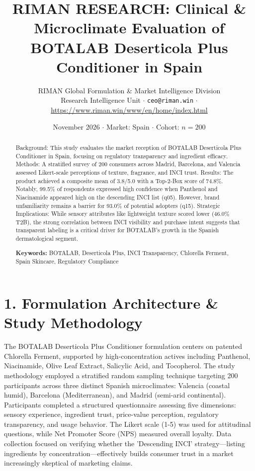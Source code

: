 \documentclass[10pt,twocolumn,a4paper]{article}
\title{\textbf{RIMAN RESEARCH: Clinical \& Microclimate Evaluation of BOTALAB Deserticola Plus Conditioner in Spain}}
\author{RIMAN Global Formulation \& Market Intelligence Division\\
\small Research Intelligence Unit $\cdot$ \texttt{ceo@riman.win} $\cdot$ \url{https://www.riman.win/www/en/home/index.html}}
\date{November 2026 \quad $\cdot$ \quad Market: Spain \quad $\cdot$ \quad Cohort: $n = 200$}
\begin{document}
\maketitle

\begin{abstract}
Background: This study evaluates the market reception of BOTALAB Deserticola Plus Conditioner in Spain, focusing on regulatory transparency and ingredient efficacy. Methods: A stratified survey of 200 consumers across Madrid, Barcelona, and Valencia assessed Likert-scale perceptions of texture, fragrance, and INCI trust. Results: The product achieved a composite mean of 3.8/5.0 with a Top-2-Box score of 74.8\%. Notably, 99.5\% of respondents expressed high confidence when Panthenol and Niacinamide appeared high on the descending INCI list (q05). However, brand unfamiliarity remains a barrier for 93.0\% of potential adopters (q15). Strategic Implications: While sensory attributes like lightweight texture scored lower (46.0\% T2B), the strong correlation between INCI visibility and purchase intent suggests that transparent labeling is a critical driver for BOTALAB's growth in the Spanish dermatological segment.

\vspace{0.4em}
\noindent\textbf{Keywords:} BOTALAB, Deserticola Plus, INCI Transparency, Chlorella Ferment, Spain Skincare, Regulatory Compliance
\end{abstract}

\section{1. Formulation Architecture \& Study Methodology}
The BOTALAB Deserticola Plus Conditioner formulation centers on patented Chlorella Ferment, supported by high-concentration actives including Panthenol, Niacinamide, Olive Leaf Extract, Salicylic Acid, and Tocopherol. The study methodology employed a stratified random sampling technique targeting 200 participants across three distinct Spanish microclimates: Valencia (coastal humid), Barcelona (Mediterranean), and Madrid (semi-arid continental). Participants completed a structured questionnaire assessing five dimensions: sensory experience, ingredient trust, price-value perception, regulatory transparency, and usage behavior. The Likert scale (1-5) was used for attitudinal questions, while Net Promoter Score (NPS) measured overall loyalty. Data collection focused on verifying whether the 'Descending INCI' strategy—listing ingredients by concentration—effectively builds consumer trust in a market increasingly skeptical of marketing claims.
\end{document}
